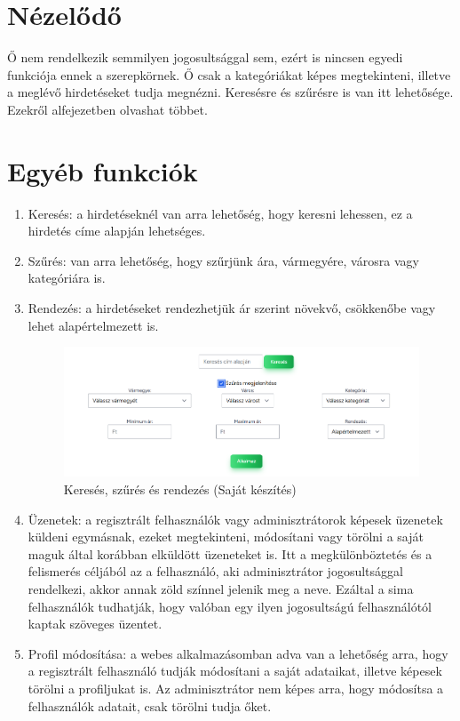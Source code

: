 \documentclass[]{thesis-ekf}
\theoremstyle{definition}
\theoremstyle{remark}
\begin{document}
	\section{Nézelődő}
		Ő nem rendelkezik semmilyen jogosultsággal sem, ezért is nincsen egyedi funkciója ennek a szerepkörnek. Ő csak a kategóriákat képes megtekinteni, illetve a meglévő hirdetéseket tudja megnézni. Keresésre és szűrésre is van itt lehetősége. Ezekről  alfejezetben olvashat többet.
	\section{Egyéb funkciók}\label{egyeb-funkciok}
		\begin{enumerate}
			\item Keresés: a hirdetéseknél van arra lehetőség, hogy keresni lehessen, ez a hirdetés címe alapján lehetséges.
			\item Szűrés: van arra lehetőség, hogy szűrjünk ára, vármegyére, városra vagy kategóriára is.
			\item Rendezés: a hirdetéseket rendezhetjük ár szerint növekvő, csökkenőbe vagy lehet alapértelmezett is.
				\begin{figure}[ht!]
				\centering
				\includegraphics[width=13cm]{./felhasznaloi/kereses-szures}
				\caption{Keresés, szűrés és rendezés (Saját készítés)} 
				\label{kereses-szures-muvelet}
			\end{figure}
			\item Üzenetek: a regisztrált felhasználók vagy adminisztrátorok képesek üzenetek küldeni egymásnak, ezeket megtekinteni, módosítani vagy törölni a saját maguk által korábban elküldött üzeneteket is. Itt a megkülönböztetés és a felismerés céljából az a felhasználó, aki adminisztrátor jogosultsággal rendelkezi, akkor annak zöld színnel jelenik meg a neve. Ezáltal a sima felhasználók tudhatják, hogy valóban egy ilyen jogosultságú felhasználótól kaptak szöveges üzentet.
			\item Profil módosítása: a webes alkalmazásomban adva van a lehetőség arra, hogy a regisztrált felhasználó tudják módosítani a saját adataikat, illetve képesek törölni a profiljukat is. Az adminisztrátor nem képes arra, hogy módosítsa a felhasználók adatait, csak törölni tudja őket.

\end{enumerate}
\end{document}

